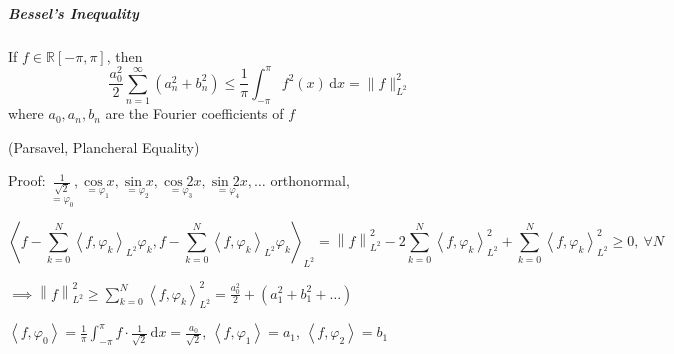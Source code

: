 \subparagraph*{Bessel's Inequality}

If $f\in\mathbb{R}[-\pi,\pi]$, then
$$\frac{a_0^2}{2}\sum_{n=1}^{\infty}\left(a_n^2+b_n^2\right)\leq\frac{1}{\pi}\int_{-\pi}^{\pi}f^2(x)\,\mathrm{d}x=\|f\|^2_{L^2}$$
where $a_0,a_n,b_n$ are the Fourier coefficients of $f$

(Parsavel, Plancheral Equality)

Proof: $\underset{=\varphi_0}{\frac{1}{\sqrt{2}}},\underset{=\varphi_1}{\cos x},\underset{=\varphi_2}{\sin x},\underset{=\varphi_3}{\cos 2x},\underset{=\varphi_4}{\sin 2x},\dots$ orthonormal,

$$\left<f-\sum_{k=0}^N\left<f,\varphi_k\right>_{L^2}\varphi_k,f-\sum_{k=0}^N\left<f,\varphi_k\right>_{L^2}\varphi_k\right>_{L^2}=\left\|f\right\|_{L^2}^2-2\sum_{k=0}^N\left<f,\varphi_k\right>_{L^2}^2+\sum_{k=0}^N\left<f,\varphi_k\right>_{L^2}^2\geq 0,\ \forall N$$

$\implies\left\|f\right\|_{L^2}^2\geq\sum_{k=0}^N\left<f,\varphi_k\right>_{L^2}^2=\frac{a_0^2}{2}+\left(a_1^2+b_1^2+\dots\right)$

$\left<f,\varphi_0\right>=\frac{1}{\pi}\int_{-\pi}^{\pi}f\cdot\frac{1}{\sqrt{2}}\,\mathrm{d}x=\frac{a_0}{\sqrt{2}}$, $\left<f,\varphi_1\right>=a_1$, $\left<f,\varphi_2\right>=b_1$
